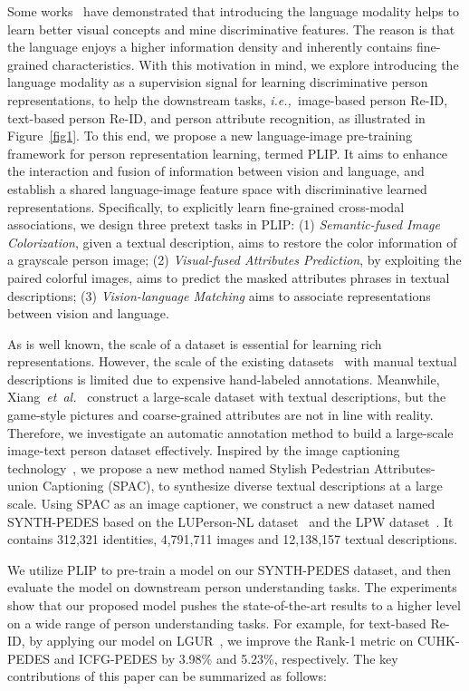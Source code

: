 \documentclass[10pt,twocolumn,letterpaper]{article}
\def\ie{{\it{i.e.,~}}}
\def\etal{{\it{et~al.\xspace}}}
\begin{document}
Some works~\cite{CLIP,BLIP,lightningdot} have demonstrated that introducing the language modality helps to learn better visual concepts and mine discriminative features. The reason is that the language enjoys a higher information density and inherently contains fine-grained characteristics. With this motivation in mind, we explore introducing the language modality as a supervision signal for learning discriminative person representations, to help the downstream tasks, \ie image-based person Re-ID, text-based person Re-ID, and person attribute recognition, as illustrated in Figure~\ref{fig1}. To this end, we propose a new language-image pre-training framework for person representation learning, termed PLIP. It aims to enhance the interaction and fusion of information between vision and language, and establish a shared language-image feature space with discriminative learned representations. Specifically, to explicitly learn fine-grained cross-modal associations, we design three pretext tasks in PLIP: (1) \textit{Semantic-fused Image Colorization}, given a textual description, aims to restore the color information of a grayscale person image; (2) \textit{Visual-fused Attributes Prediction}, by exploiting the paired colorful images, aims to predict the masked attributes phrases in textual descriptions; (3) \textit{Vision-language Matching} aims to associate representations between vision and language. 

As is well known, the scale of a dataset is essential for learning rich representations. However, the scale of the existing datasets~\cite{SSAN,textreid} with manual textual descriptions is limited due to expensive hand-labeled annotations. Meanwhile, Xiang~\etal~\cite{VTBR} construct a large-scale dataset with textual descriptions, but the game-style pictures and coarse-grained attributes are not in line with reality. Therefore, we investigate an automatic annotation method to build a large-scale image-text person dataset effectively. Inspired by the image captioning technology~\cite{imcaption,imcaption2,clipcap}, we propose a new method named Stylish Pedestrian Attributes-union Captioning (SPAC), to synthesize diverse textual descriptions at a large scale. Using SPAC as an image captioner, we construct a new dataset named SYNTH-PEDES based on the LUPerson-NL dataset~\cite{LUPnl} and the LPW dataset~\cite{LPW}. It contains 312,321 identities, 4,791,711 images and 12,138,157 textual descriptions.

We utilize PLIP to pre-train a model on our SYNTH-PEDES dataset, and then evaluate the model on downstream person understanding tasks. The experiments show that our proposed model pushes the state-of-the-art results to a higher level on a wide range of person understanding tasks. For example, for text-based Re-ID, by applying our model on LGUR~\cite{LGUR}, we improve the Rank-1 metric on CUHK-PEDES and ICFG-PEDES by 3.98\% and 5.23\%, respectively. The key contributions of this paper can be summarized as follows:
\end{document}
